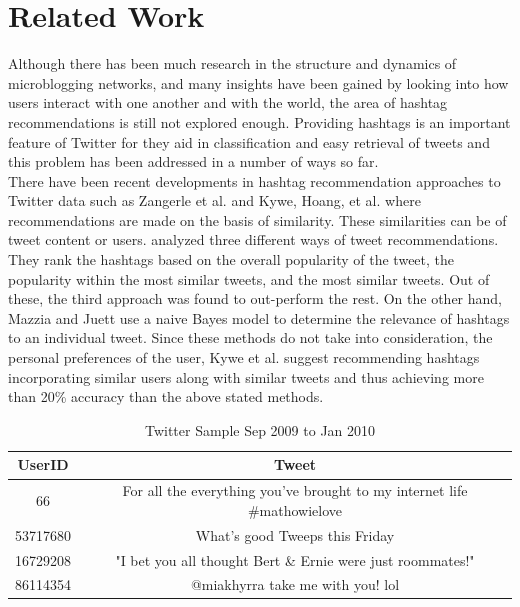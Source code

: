 \documentclass{acm_proc_article-sp}
\begin{document}
\section{Related Work}
\hspace*{5mm}Although there has been much research in the structure and dynamics of microblogging networks, and many insights have been gained by looking into how users interact with one another and with the world, the area of hashtag recommendations is still not explored enough. Providing hashtags is an important feature of Twitter for they aid in classification and easy retrieval of tweets and this problem has been addressed in a number of ways so far.\\
\hspace*{5mm}There have been recent developments in hashtag recommendation approaches to Twitter data such as Zangerle et al. \cite{zangerle2011recommending} and Kywe, Hoang, et al. \cite{kywe2012recommending} where recommendations are made on the basis of similarity. These similarities can be of tweet content or users. \cite{zangerle2011recommending} analyzed three different ways of tweet recommendations. They rank the hashtags based on the overall popularity of the tweet, the popularity within the most similar tweets, and the most similar tweets. Out of these, the third approach was found to out-perform the rest. On the other hand, Mazzia and Juett \cite{mazzia2009suggesting} use a naive Bayes model to determine the relevance of hashtags to an individual tweet. Since these methods do not take into consideration, the personal preferences of the user, Kywe et al. \cite{kywe2012recommending} suggest recommending hashtags incorporating similar users along with similar tweets and thus achieving more than 20\% accuracy than the above stated methods.\\
\begin{table}[ht]
	\caption{Twitter Sample Sep 2009 to Jan 2010}
	\centering
	\begin{tabular}{c c}   
		\hline\hline\rule{0pt}{2ex}
		UserID & Tweet \\
		\hline\rule{0pt}{3ex}
		66 & For all the everything you've brought to my internet life \#mathowielove \\
		53717680 & What's good Tweeps this Friday \\
		16729208 &"I bet you all thought Bert \& Ernie were just roommates!" \\ 
		86114354 & @miakhyrra take me with you! lol \\ [1ex] 
		\hline 
	\end{tabular}
	\label{table:sample} %
\end{table}
\end{document}
